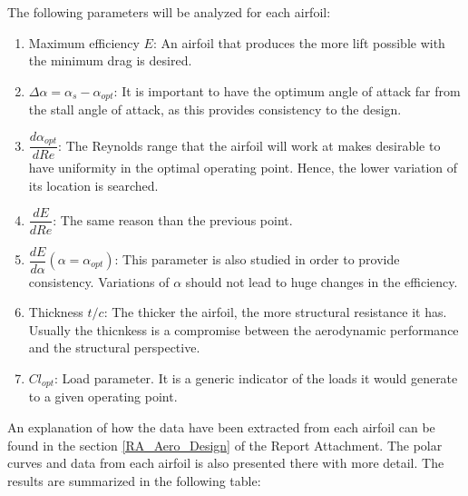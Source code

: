 \documentclass[../TFG_Report.tex]{subfiles}
\begin{document}
\FloatBarrier

The following parameters will be analyzed for each airfoil:



\begin{enumerate}
	\item Maximum efficiency $E$: An airfoil that produces the more lift possible with the minimum drag is desired. 
	\item $\Delta \alpha=\alpha_{s}-\alpha_{opt}$: It is important to have the optimum angle of attack far from the stall angle of attack, as this provides consistency to the design. 
	\item $\dfrac{d\alpha_{opt}}{dRe}$: The Reynolds range that the airfoil will work at makes desirable to have uniformity in the optimal operating point. Hence, the lower variation of its location is searched. 
	\item $\dfrac{dE}{dRe}$: The same reason than the previous point. 
	\item $\dfrac{dE}{d \alpha} (\alpha=\alpha_{opt})$: This parameter is also studied in order to provide consistency. Variations of $\alpha$ should not lead to huge changes in the efficiency. 
	\item Thickness $t/c$: The thicker the airfoil, the more structural resistance it has. Usually the thicnkess is a compromise between the aerodynamic performance and the structural perspective. 
	\item $Cl_{opt}$: Load parameter. It is a generic indicator of the loads it would generate to a given operating point. 
	
\end{enumerate}

An explanation of how the data have been extracted from each airfoil can be found in the section \ref{RA_Aero_Design} of the Report Attachment. The polar curves and data from each airfoil is also presented there with more detail. The results are summarized in the following table: 
\end{document}
